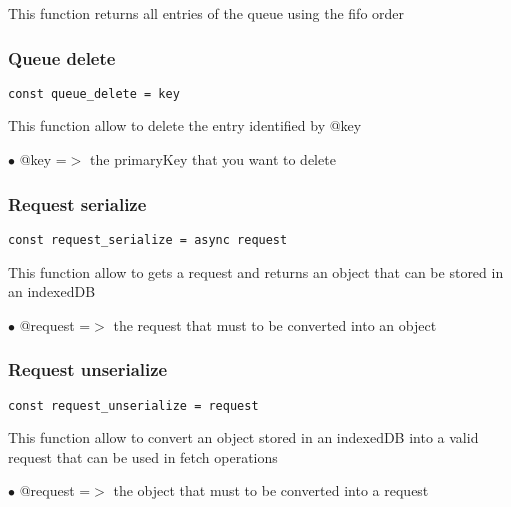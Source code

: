 \documentclass[a4paper]{article}
\begin{document}
This function returns all entries of the queue using the fifo
order

\hypertarget{toc826}{}
\subsubsection{Queue delete}

\begin{lstlisting}
const queue_delete = key
\end{lstlisting}

This function allow to delete the entry identified by @key

\begin{compactitem}
\item[\color{myblue}$\bullet$] @key =$>$ the primaryKey that you want to delete
\end{compactitem}

\hypertarget{toc827}{}
\subsubsection{Request serialize}

\begin{lstlisting}
const request_serialize = async request
\end{lstlisting}

This function allow to gets a request and returns an object
that can be stored in an indexedDB

\begin{compactitem}
\item[\color{myblue}$\bullet$] @request =$>$ the request that must to be converted into an object
\end{compactitem}

\hypertarget{toc828}{}
\subsubsection{Request unserialize}

\begin{lstlisting}
const request_unserialize = request
\end{lstlisting}

This function allow to convert an object stored in an indexedDB
into a valid request that can be used in fetch operations

\begin{compactitem}
\item[\color{myblue}$\bullet$] @request =$>$ the object that must to be converted into a request
\end{compactitem}
\end{document}
